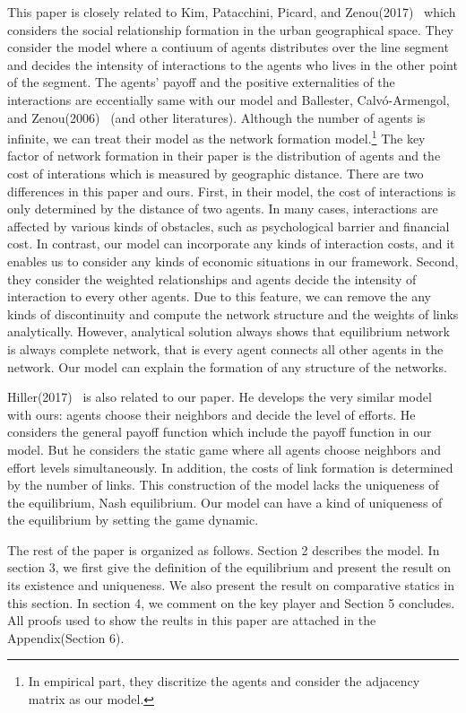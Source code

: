 \documentclass[12pt]{article}
\theoremstyle{definition}
\begin{document}
This paper is closely related to Kim, Patacchini, Picard, and Zenou(2017)~\cite{Urban} which considers the social relationship formation in the urban geographical space.
They consider the model where a contiuum of agents distributes over the line segment and decides the intensity of interactions to the agents who lives in the other point of the segment.
The agents' payoff and the positive externalities of the interactions are eccentially same with our model and Ballester, Calv\'{o}-Armengol, and Zenou(2006)~\cite{whowho} (and other literatures).
Although the number of agents is infinite, we can treat their model as the network formation model.\footnote{In empirical part, they discritize the agents and consider the adjacency matrix as our model.}
The key factor of network formation in their paper is the distribution of agents and the cost of interations which is measured by geographic distance.
There are two differences in this paper and ours.
First, in their model, the cost of interactions is only determined by the distance of two agents.
In many cases, interactions are affected by various kinds of obstacles, such as psychological barrier and financial cost.
In contrast, our model can incorporate any kinds of interaction costs, and it enables us to consider any kinds of economic situations in our framework.
Second, they consider the weighted relationships and agents decide the intensity of interaction to every other agents.
Due to this feature, we can remove the any kinds of discontinuity and compute the network structure and the weights of links analytically.
However, analytical solution always shows that equilibrium network is always complete network, that is every agent connects all other agents in the network.
Our model can explain the formation of any structure of the networks.

Hiller(2017)~\cite{hiller} is also related to our paper.
He develops the very similar model with ours: agents choose their neighbors and decide the level of efforts.
He considers the general payoff function which include the payoff function in our model.
But he considers the static game where all agents choose neighbors and effort levels simultaneously.
In addition, the costs of link formation is determined by the number of links.
This construction of the model lacks the uniqueness of the equilibrium, Nash equilibrium.
Our model can have a kind of uniqueness of the equilibrium by setting the game dynamic.

The rest of the paper is organized as follows.
Section 2 describes the model.
In section 3, we first give the definition of the equilibrium and present the result on its existence and uniqueness.
We also present the result on comparative statics in this section.
In section 4, we comment on the key player and Section 5 concludes.
All proofs used to show the reults in this paper are attached in the Appendix(Section 6).
\end{document}
